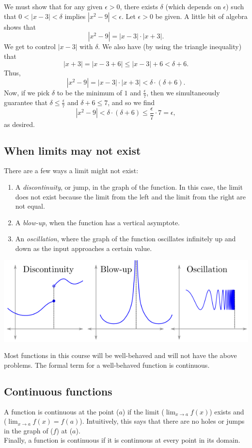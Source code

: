 \documentclass[twoside,openright,titlepage,a4paper]{book}
\begin{document}
\begin{sloppypar}
\begin{examplebox}
We must show that for any given $\epsilon>0$, there exists $\delta$ (which depends on $\epsilon$) such that $0<|x-3|<\delta$ implies $|x^2-9|<\epsilon$.
Let $\epsilon>0$ be given. A little bit of algebra shows that \[ |x^2-9| = |x-3| \cdot |x+3|. \]
We get to control $|x-3|$ with $\delta$. We also have (by using the triangle inequality) that \[ |x+3| = |x-3+6| \leq |x-3|+6 < \delta + 6. \]
Thus, \[ |x^2-9| = |x-3|\cdot |x+3| < \delta \cdot (\delta + 6). \]
Now, if we pick $\delta$ to be the minimum of $1$ and $\frac{\epsilon}{7}$, then we simultaneously guarantee that $\delta \leq \frac{\epsilon}{7}$ and $\delta + 6 \leq 7$, and so we find \[ |x^2-9| < \delta \cdot (\delta + 6) \leq \frac{\epsilon}{7} \cdot 7 = \epsilon, \] as desired.
\end{examplebox}
\subsection{When limits may not exist}
There are a few ways a limit might not exist:
\begin{enumerate}
	\item A \textit{discontinuity}, or jump, in the graph of the function. In this case, the limit does not exist because the limit from the left and the limit from the right are not equal.
	\item A \textit{blow-up}, when the function has a vertical asymptote.
	\item An \textit{oscillation}, where the graph of the function oscillates infinitely up and down as the input approaches a certain value.
\end{enumerate}
\begin{center}\includegraphics[scale=0.6]{LimitFails}\end{center}
Most functions in this course will be well-behaved and will not have the above problems. The formal term for a well-behaved function is continuous.

\subsection{Continuous functions}
A function is continuous at the point ($a$) if the limit ($\lim_{x \rightarrow a} f(x)$) exists and ($\lim_{x \rightarrow a} f(x) = f(a)$). Intuitively, this says that there are no holes or jumps in the graph of ($f$) at ($a$).\\
Finally, a function is continuous if it is continuous at every point in its domain.


\end{sloppypar}
\end{document}
